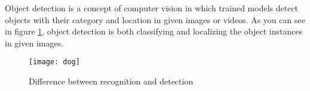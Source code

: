 \documentclass{article}
\begin{document}
\setlength{\parindent}{6ex}

\indent

Object detection is a concept of computer vision in which trained models 
detect objects with their category and location in given images or videos. 
As you can see in figure \ref{fig:dog1}, object detection is both 
classifying and localizing the object instances in given images.

\begin{figure}
    \centering
    \texttt{[image: dog]}
    \caption{Difference between recognition and detection}
    \label{fig:dog1}
\end{figure}
\end{document}
